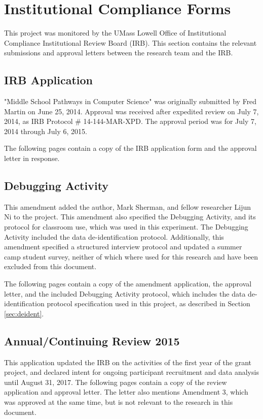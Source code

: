 \chapter{Institutional Compliance Forms}
This project was monitored by the UMass Lowell Office of Institutional Compliance Institutional Review Board (IRB). This section contains the relevant submissions and approval letters between the research team and the IRB.

\section{IRB Application}
\label{IRB:app}
"Middle School Pathways in Computer Science" was originally submitted by Fred Martin on June 25, 2014. Approval was received after expedited review on July 7, 2014, as IRB Protocol \# 14-144-MAR-XPD. The approval period was for July 7, 2014 through July 6, 2015.

The following pages contain a copy of the IRB application form and the approval letter in response.




\section{Debugging Activity}
This amendment added the author, Mark Sherman, and fellow researcher Lijun Ni to the project. This amendment also specified the Debugging Activity, and its protocol for classroom use, which was used in this experiment. The Debugging Activity included the data de-identification protocol. Additionally, this amendment specified a structured interview protocol and updated a summer camp student survey, neither of which where used for this research and have been excluded from this document.

The following pages contain a copy of the amendment application, the approval letter, and the included Debugging Activity protocol, which includes the data de-identification protocol specification used in this project, as described in Section \ref{sec:deident}.



\label{IRB:deident}


\section{Annual/Continuing Review 2015}
This application updated the IRB on the activities of the first year of the grant project, and declared intent for ongoing participant recruitment and data analysis until August 31, 2017. The following pages contain a copy of the review application and approval letter. The letter also mentions Amendment 3, which was approved at the same time, but is not relevant to the research in this document.

